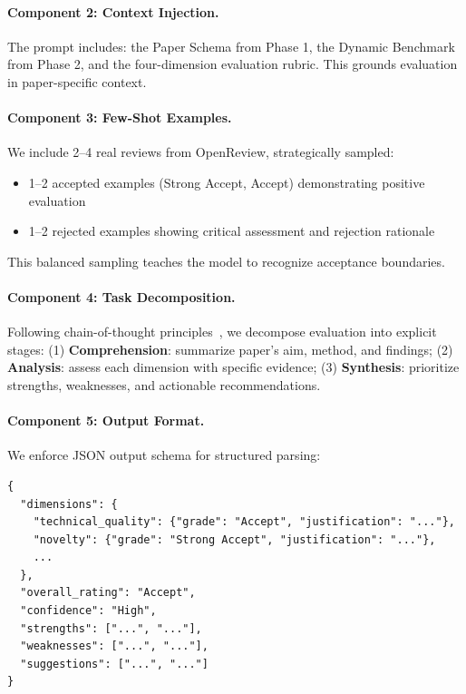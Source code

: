 \paragraph{Component 2: Context Injection.} The prompt includes: the Paper Schema from Phase 1, the Dynamic Benchmark from Phase 2, and the four-dimension evaluation rubric. This grounds evaluation in paper-specific context.

\paragraph{Component 3: Few-Shot Examples.} We include 2--4 real reviews from OpenReview, strategically sampled:
\begin{itemize}[nosep,leftmargin=*]
    \item 1--2 accepted examples (Strong Accept, Accept) demonstrating positive evaluation
    \item 1--2 rejected examples showing critical assessment and rejection rationale
\end{itemize}
This balanced sampling teaches the model to recognize acceptance boundaries.

\paragraph{Component 4: Task Decomposition.} Following chain-of-thought principles~\cite{wei2022chain}, we decompose evaluation into explicit stages: (1) \textbf{Comprehension}: summarize paper's aim, method, and findings; (2) \textbf{Analysis}: assess each dimension with specific evidence; (3) \textbf{Synthesis}: prioritize strengths, weaknesses, and actionable recommendations.

\paragraph{Component 5: Output Format.} We enforce JSON output schema for structured parsing:

\begin{verbatim}
{
  "dimensions": {
    "technical_quality": {"grade": "Accept", "justification": "..."},
    "novelty": {"grade": "Strong Accept", "justification": "..."},
    ...
  },
  "overall_rating": "Accept",
  "confidence": "High",
  "strengths": ["...", "..."],
  "weaknesses": ["...", "..."],
  "suggestions": ["...", "..."]
}
\end{verbatim}


